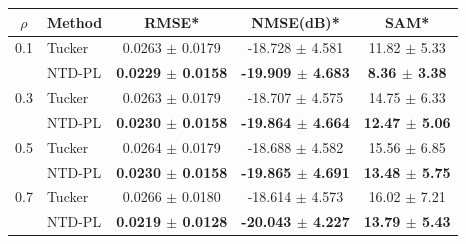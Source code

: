 \begin{tabular}{c l c c c}
    \toprule
    $\rho$ & Method & RMSE* & NMSE(dB)* & SAM* \\
    \midrule
    0.1 & Tucker & 0.0263 $\pm$ 0.0179 & -18.728 $\pm$ 4.581 & 11.82 $\pm$ 5.33 \\
     & NTD-PL & \textbf{0.0229 $\pm$ 0.0158} & \textbf{-19.909 $\pm$ 4.683} & \textbf{8.36 $\pm$ 3.38} \\
    \midrule
    0.3 & Tucker & 0.0263 $\pm$ 0.0179 & -18.707 $\pm$ 4.575 & 14.75 $\pm$ 6.33 \\
     & NTD-PL & \textbf{0.0230 $\pm$ 0.0158} & \textbf{-19.864 $\pm$ 4.664} & \textbf{12.47 $\pm$ 5.06} \\
    \midrule
    0.5 & Tucker & 0.0264 $\pm$ 0.0179 & -18.688 $\pm$ 4.582 & 15.56 $\pm$ 6.85 \\
     & NTD-PL & \textbf{0.0230 $\pm$ 0.0158} & \textbf{-19.865 $\pm$ 4.691} & \textbf{13.48 $\pm$ 5.75} \\
    \midrule
    0.7 & Tucker & 0.0266 $\pm$ 0.0180 & -18.614 $\pm$ 4.573 & 16.02 $\pm$ 7.21 \\
     & NTD-PL & \textbf{0.0219 $\pm$ 0.0128} & \textbf{-20.043 $\pm$ 4.227} & \textbf{13.79 $\pm$ 5.43} \\
    \bottomrule
\end{tabular}
